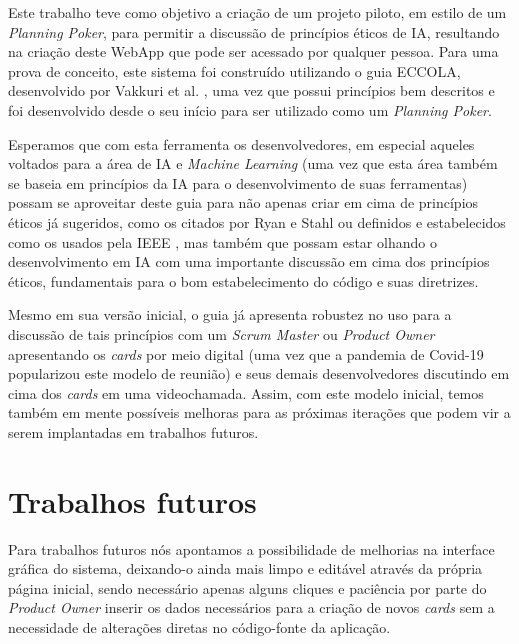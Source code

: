 \label{consideracoes}

Este trabalho teve como objetivo a criação de um projeto piloto, em estilo de um \textit{Planning Poker}, para permitir a discussão de princípios éticos de \acrshort{IA}, resultando na criação deste WebApp que pode ser acessado por qualquer pessoa. Para uma prova de conceito, este sistema foi construído utilizando o guia ECCOLA, desenvolvido por Vakkuri et al. \cite{ECCOLA}, uma vez que possui princípios bem descritos e foi desenvolvido desde o seu início para ser utilizado como um \textit{Planning Poker}. 

Esperamos que com esta ferramenta os desenvolvedores, em especial aqueles voltados para a área de \acrshort{IA} e \textit{Machine Learning} (uma vez que esta área também se baseia em princípios da \acrshort{IA} para o desenvolvimento de suas ferramentas) possam se aproveitar deste guia para não apenas criar em cima de princípios éticos já sugeridos, como os citados por Ryan e Stahl \cite{Ryan2020ArtificialIE} ou definidos e estabelecidos como os usados pela IEEE \cite{ieee2020EADv1}, mas também que possam estar olhando o desenvolvimento em IA com uma importante discussão em cima dos princípios éticos, fundamentais para o bom estabelecimento do código e suas diretrizes.

Mesmo em sua versão inicial, o guia já apresenta robustez no uso para a discussão de tais princípios com um \textit{Scrum Master} ou \textit{Product Owner} apresentando os \textit{cards} por meio digital (uma vez que a pandemia de Covid-19 popularizou este modelo de reunião) e seus demais desenvolvedores discutindo em cima dos \textit{cards} em uma videochamada. Assim, com este modelo inicial, temos também em mente possíveis melhoras para as próximas iterações que podem vir a serem implantadas em trabalhos futuros.

\section{Trabalhos futuros}

Para trabalhos futuros nós apontamos a possibilidade de melhorias na interface gráfica do sistema, deixando-o ainda mais limpo e editável através da própria página inicial, sendo necessário apenas alguns cliques e paciência por parte do \textit{Product Owner} inserir os dados necessários para a criação de novos \textit{cards} sem a necessidade de alterações diretas no código-fonte da aplicação.

